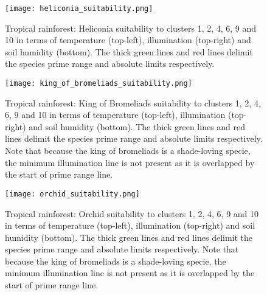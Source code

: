 \begin{figure}
\center
	\texttt{[image: heliconia\_suitability.png]}
	\caption{ Tropical rainforest: Heliconia suitability to clusters 1, 2, 4, 6, 9 and 10 in terms of temperature (top-left), illumination (top-right) and soil humidity (bottom). The thick green lines and red lines delimit the species prime range and absolute limits respectively.}
	\label{fig:results_tropical_heliconia_suitability}
\end{figure}

\begin{figure}
\center
	\texttt{[image: king\_of\_bromeliads\_suitability.png]}
	\caption{ Tropical rainforest: King of Bromeliads suitability to clusters 1, 2, 4, 6, 9 and 10 in terms of temperature (top-left), illumination (top-right) and soil humidity (bottom). The thick green lines and red lines delimit the species prime range and absolute limits respectively. Note that because the king of bromeliads is a shade-loving specie, the minimum illumination line is not present as it is overlapped by the start of prime range line.}
	\label{fig:results_tropical_king_of_bromeliads_suitability}
\end{figure}

\begin{figure}
\center
	\texttt{[image: orchid\_suitability.png]}
	\caption{ Tropical rainforest: Orchid suitability to clusters 1, 2, 4, 6, 9 and 10 in terms of temperature (top-left), illumination (top-right) and soil humidity (bottom). The thick green lines and red lines delimit the species prime range and absolute limits respectively. Note that because the king of bromeliads is a shade-loving specie, the minimum illumination line is not present as it is overlapped by the start of prime range line.}
	\label{fig:results_tropical_orchid_suitability}
\end{figure}

